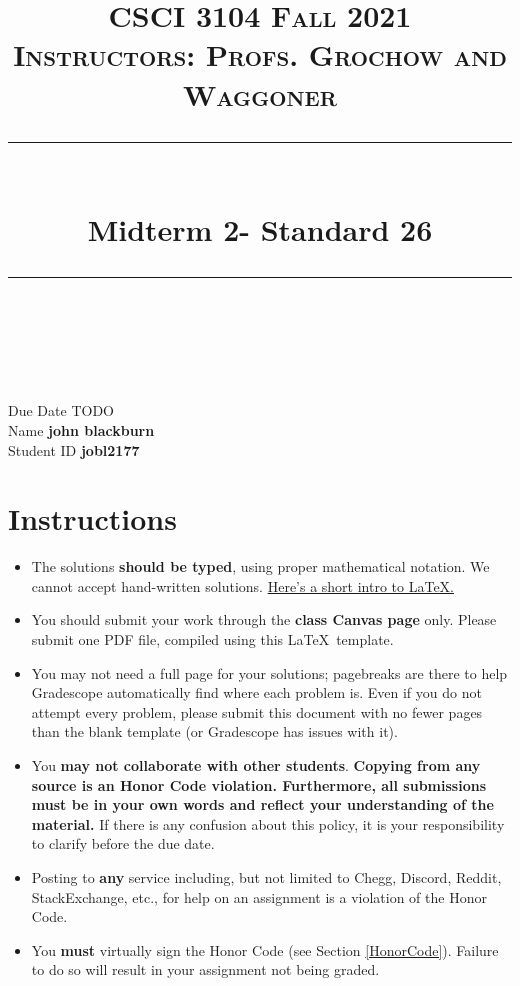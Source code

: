 \documentclass[11pt]{article}
\title{
\normalfont \normalsize 
\textsc{CSCI 3104 Fall 2021 \\ 
Instructors: Profs. Grochow and Waggoner} \\
[10pt] 
\rule{\linewidth}{0.5pt} \\[6pt] 
\huge Midterm 2- Standard 26 \\
\rule{\linewidth}{2pt}  \\[10pt]
}
\date{}
\theoremstyle{definition}
\theoremstyle{definition}
\theoremstyle{definition}
\begin{document}

\maketitle


\noindent
Due Date \dotfill TODO \\
Name \dotfill \textbf{john blackburn} \\
Student ID \dotfill \textbf{jobl2177} \\


\tableofcontents

\section{Instructions}
 \begin{itemize}
	\item The solutions \textbf{should be typed}, using proper mathematical notation. We cannot accept hand-written solutions. \href{http://ece.uprm.edu/~caceros/latex/introduction.pdf}{Here's a short intro to \LaTeX.}
	\item You should submit your work through the \textbf{class Canvas page} only. Please submit one PDF file, compiled using this \LaTeX \ template.
	\item You may not need a full page for your solutions; pagebreaks are there to help Gradescope automatically find where each problem is. Even if you do not attempt every problem, please submit this document with no fewer pages than the blank template (or Gradescope has issues with it).

	\item You \textbf{may not collaborate with other students}. \textbf{Copying from any source is an Honor Code violation. Furthermore, all submissions must be in your own words and reflect your understanding of the material.} If there is any confusion about this policy, it is your responsibility to clarify before the due date. 

	\item Posting to \textbf{any} service including, but not limited to Chegg, Discord, Reddit, StackExchange, etc., for help on an assignment is a violation of the Honor Code.

	\item You \textbf{must} virtually sign the Honor Code (see Section \ref{HonorCode}). Failure to do so will result in your assignment not being graded.
\end{itemize}
\end{document}
